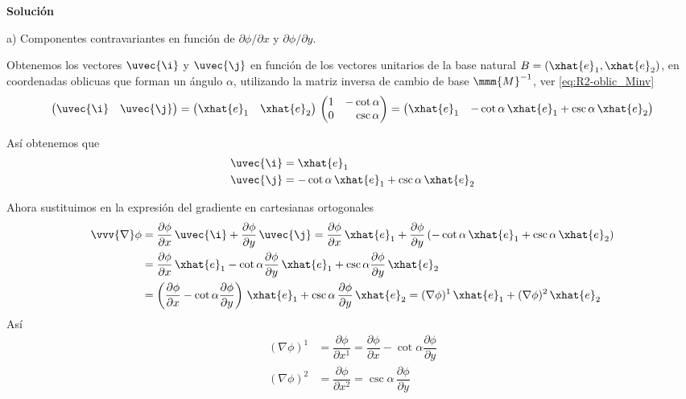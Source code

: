 \noindent
\textbf{Solución}

\noindent
a) Componentes contravariantes en función de $\partial\phi/\partial x$ y
$\partial\phi/\partial y$.

Obtenemos los vectores $\uvec{\i}$ y $\uvec{\j}$ en función de los vectores
unitarios de la base natural $B=(\xhat{e}_1, \xhat{e}_2)$, en coordenadas oblicuas que
forman un ángulo $\alpha$, utilizando la matriz inversa de cambio de base
$\mmm{M}^{-1}$, ver \eqref{eq:R2-oblic_Minv}
\[
  \begin{pmatrix}
    \uvec{\i} & \uvec{\j}
  \end{pmatrix}
  =
  \begin{pmatrix}
    \xhat{e}_1 & \xhat{e}_2
  \end{pmatrix}
  \,
  \begin{pmatrix}
    1 & -\cot\alpha\\
    0 & \phantom{-}\csc\alpha
  \end{pmatrix}
  =
  \begin{pmatrix}
    \xhat{e}_1 & -\cot\alpha\,\xhat{e}_1 + \csc\alpha\,\xhat{e}_2
  \end{pmatrix}
\]

Así obtenemos que
\begin{align*}
  \uvec{\i} &= \xhat{e}_1\\
  \uvec{\j} &= -\cot\alpha\,\xhat{e}_1 + \csc\alpha\,\xhat{e}_2
\end{align*}

Ahora sustituimos en la expresión del gradiente en cartesianas ortogonales
\begin{align*}
  \vvv{\nabla}\phi
  &=
    \dfrac{\partial\phi}{\partial x}\,\uvec{\i}
    + \dfrac{\partial\phi}{\partial y}\,\uvec{\j}
    = \dfrac{\partial\phi}{\partial x}\,\xhat{e}_1
    + \dfrac{\partial\phi}{\partial y}
    \left(-\cot\alpha\,\xhat{e}_1+\csc\alpha\,\xhat{e}_2\right)\\
  &=
    \dfrac{\partial\phi}{\partial x}\,\xhat{e}_1
    - \cot\alpha\dfrac{\partial\phi}{\partial y}\,\xhat{e}_1
    + \csc\alpha\dfrac{\partial\phi}{\partial y}\,\xhat{e}_2\\
  &=
    \left(%
    \dfrac{\partial\phi}{\partial x}-\cot\alpha\dfrac{\partial\phi}{\partial y}
    \right)\,\xhat{e}_1
    + \csc\alpha\,\dfrac{\partial\phi}{\partial y}\,\xhat{e}_2
    = (\nabla\phi)^1\,\xhat{e}_1 + (\nabla\phi)^2\,\xhat{e}_2
\end{align*}
Así
\begin{align*}
  (\nabla\phi)^1
  &=
    \dfrac{\partial\phi}{\partial x^1}
    = \dfrac{\partial\phi}{\partial x}-\cot\alpha\dfrac{\partial\phi}{\partial y}\\
  (\nabla\phi)^2
  &=
    \dfrac{\partial\phi}{\partial x^2}
    = \csc\alpha\,\dfrac{\partial\phi}{\partial y}
\end{align*}
  
